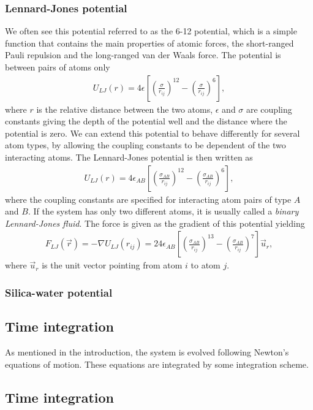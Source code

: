 \subsubsection{Lennard-Jones potential}
We often see this potential referred to as the 6-12 potential, which is a simple function that contains the main properties of atomic forces, the short-ranged Pauli repulsion and the long-ranged van der Waals force. The potential is between pairs of atoms only
\begin{align}
	\label{eq:md_potential_energy}
	U_{LJ}(r) = 4\epsilon\left[\left(\frac{\sigma}{r_{ij}}\right)^{12} - \left(\frac{\sigma}{r_{ij}}\right)^{6}\right],
\end{align}
where $r$ is the relative distance between the two atoms, $\epsilon$ and $\sigma$ are coupling constants giving the depth of the potential well and the distance where the potential is zero. We can extend this potential to behave differently for several atom types, by allowing the coupling constants to be dependent of the two interacting atoms. The Lennard-Jones potential is then written as
\begin{align}
	U_{LJ}(r) = 4\epsilon_{AB}\left[\left(\frac{\sigma_{AB}}{r_{ij}}\right)^{12} - \left(\frac{\sigma_{AB}}{r_{ij}}\right)^{6}\right],
\end{align}
where the coupling constants are specified for interacting atom pairs of type $A$ and $B$. If the system has only two different atoms, it is usually called a \textit{binary Lennard-Jones fluid}. The force is given as the gradient of this potential yielding 
\begin{align*}
	F_{LJ}(\vec{r}) = -\nabla U_{LJ}(r_{ij}) = 24\epsilon_{AB}\left[\left(\frac{\sigma_{AB}}{r_{ij}}\right)^{13} - \left(\frac{\sigma_{AB}}{r_{ij}}\right)^{7}\right]\vec u_r,
\end{align*}
where $\vec u_r$ is the unit vector pointing from atom $i$ to atom $j$. 
\subsubsection{Silica-water potential}
\subsection{Time integration}
As mentioned in the introduction, the system is evolved following Newton's equations of motion. These equations are integrated by some integration scheme.
\subsection{Time integration}
